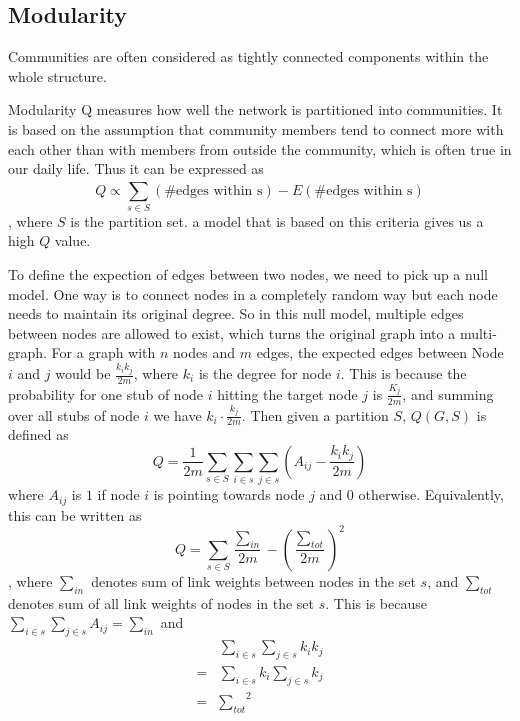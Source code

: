 \subsection{Modularity}
Communities are often considered as tightly connected components within the whole structure. 

Modularity Q measures how well the network is partitioned into communities. It is based on the assumption that community members tend to connect more with each other than with members from outside the community, which is often true in our daily life. Thus it can be expressed as  
\[ Q \propto \sum_{s\in S}^{} (\text{\#edges within s}) - E(\text{\#edges within s})\], where $S$ is the partition set. a model that is based on this criteria gives us a high $Q$ value.

To define the expection of edges between two nodes, we need to pick up a null model. One way is to connect nodes in a completely random way but each node needs to maintain its original degree\cite{newman2006modularity}. So in this null model, multiple edges between nodes are allowed to exist, which turns the original graph into a multi-graph. For a graph with $n$ nodes and $m$ edges, the expected edges between Node $i$ and $j$ would be $\frac{k_ik_j}{2m}$, where $k_i$ is the degree for node $i$. This is because the probability for one stub of node $i$ hitting the target node $j$ is $\frac{K_j}{2m}$, and summing over all stubs of node $i$ we have $k_i\cdot\frac{k_j}{2m}$. Then given a partition $S$, $Q(G,S)$ is defined as 
\begin{equation} \label{basic}
    Q = \frac{1}{2m}\sum_{s\in S} \sum_{i\in s}\sum_{j \in s} (A_{ij} - \frac{k_ik_j}{2m})    
\end{equation}
     where $A_{ij}$ is $1$ if node $i$ is pointing towards node $j$ and $0$ otherwise. Equivalently, this can be written as 
\begin{equation}
    Q = \sum_{s \in S}\frac{\sum_{in}}{2m} - {(\frac{\sum_{tot}}{2m})}^2   
\end{equation}, where $\sum_{in}$ denotes sum of link weights between nodes in the set $s$, and $\sum_{tot}$ denotes sum of all link weights of nodes in the set $s$. This is because 
$\sum_{i \in s}\sum_{j \in s}A_{ij} = \sum_{in}$ 
and 
\begin{equation*}
    \begin{split}
     & \sum_{i \in s}\sum_{j \in s} k_ik_j \\
     = & \sum_{i \in s} k_i \sum_{j \in s} k_j \\
     = & {\sum_{tot}}^2
    \end{split}
\end{equation*}

